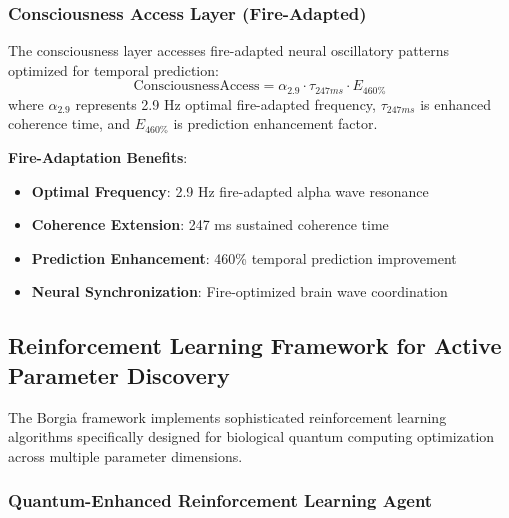 \documentclass[11pt,a4paper]{article}
\begin{document}
\begin{itemize}
\begin{itemize}
\subsubsection{Consciousness Access Layer (Fire-Adapted)}

\begin{definition}
The consciousness layer accesses fire-adapted neural oscillatory patterns optimized for temporal prediction:
\begin{equation}
\text{ConsciousnessAccess} = \alpha_{2.9} \cdot \tau_{247ms} \cdot E_{460\%}
\end{equation}
where $\alpha_{2.9}$ represents 2.9 Hz optimal fire-adapted frequency, $\tau_{247ms}$ is enhanced coherence time, and $E_{460\%}$ is prediction enhancement factor.
\end{definition}

\textbf{Fire-Adaptation Benefits}:
\begin{itemize}
\item \textbf{Optimal Frequency}: 2.9 Hz fire-adapted alpha wave resonance
\item \textbf{Coherence Extension}: 247 ms sustained coherence time
\item \textbf{Prediction Enhancement}: 460\% temporal prediction improvement
\item \textbf{Neural Synchronization}: Fire-optimized brain wave coordination
\end{itemize}

\subsection{Reinforcement Learning Framework for Active Parameter Discovery}

The Borgia framework implements sophisticated reinforcement learning algorithms specifically designed for biological quantum computing optimization across multiple parameter dimensions.

\subsubsection{Quantum-Enhanced Reinforcement Learning Agent}


\end{itemize}
\end{itemize}
\end{document}
